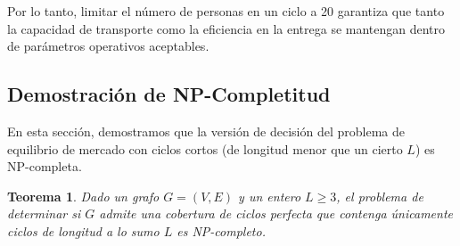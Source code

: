 \documentclass[twocolumn, fontsize=10pt]{article}
\newtheorem{theorem}{Teorema}
\begin{document}
Por lo tanto, limitar el número de personas en un ciclo a 20 garantiza que tanto la capacidad de transporte como la eficiencia en la entrega se mantengan dentro de parámetros operativos aceptables.

\subsection{Demostración de NP-Completitud}

En esta sección, demostramos que la versión de decisión del problema de equilibrio de mercado con ciclos cortos (de longitud menor que un cierto $L$) es NP-completa.

\begin{theorem}
Dado un grafo $G = (V, E)$ y un entero $L \geq 3$, el problema de determinar si $G$ admite una cobertura de ciclos perfecta que contenga únicamente ciclos de longitud a lo sumo $L$ es NP-completo.
\end{theorem}
\end{document}
